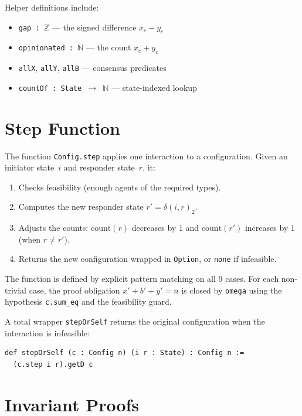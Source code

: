 \documentclass[11pt,a4paper]{article}
\begin{document}
Helper definitions include:
\begin{itemize}[nosep]
  \item \texttt{gap : $\mathbb{Z}$} --- the signed difference $x_c - y_c$
  \item \texttt{opinionated : $\mathbb{N}$} --- the count $x_c + y_c$
  \item \texttt{allX}, \texttt{allY}, \texttt{allB} --- consensus predicates
  \item \texttt{countOf : State $\to$ $\mathbb{N}$} --- state-indexed lookup
\end{itemize}

\section{Step Function}
\label{sec:step}

The function \texttt{Config.step} applies one interaction to a configuration.
Given an initiator state~$i$ and responder state~$r$, it:
\begin{enumerate}[nosep]
  \item Checks feasibility (enough agents of the required types).
  \item Computes the new responder state $r' = \delta(i,r)_2$.
  \item Adjusts the counts: $\mathrm{count}(r)$ decreases by 1 and
        $\mathrm{count}(r')$ increases by 1 (when $r \neq r'$).
  \item Returns the new configuration wrapped in \texttt{Option}, or
        \texttt{none} if infeasible.
\end{enumerate}

The function is defined by explicit pattern matching on all 9 cases.
For each non-trivial case, the proof obligation
$x' + b' + y' = n$ is closed by \texttt{omega} using the hypothesis
\texttt{c.sum\_eq} and the feasibility guard.

A total wrapper \texttt{stepOrSelf} returns the original configuration
when the interaction is infeasible:
\begin{lstlisting}
def stepOrSelf (c : Config n) (i r : State) : Config n :=
  (c.step i r).getD c
\end{lstlisting}

\section{Invariant Proofs}
\label{sec:invariants}
\end{document}
